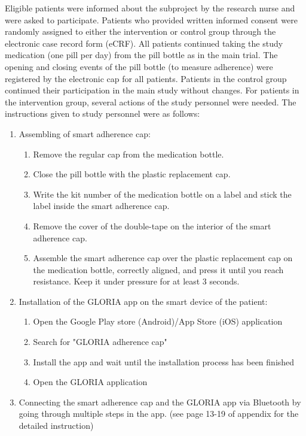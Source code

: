 \documentclass[twocolumn, issue, empirical, authordate]{jote-new-article}
\begin{document}
 Eligible patients were informed about the subproject by the research nurse and were asked to participate. Patients who provided written informed consent were randomly assigned to either the intervention or control group through the electronic case record form (eCRF). All patients continued taking the study medication (one pill per day) from the pill bottle as in the main trial. The opening and closing events of the pill bottle (to measure adherence) were registered by the electronic cap for all patients. Patients in the control group continued their participation in the main study without changes. For patients in the intervention group, several actions of the study personnel were needed.
 The instructions given to study personnel were as follows: 
\begin{enumerate}
\def\labelenumi{\arabic{enumi}.}
\item Assembling of smart adherence cap: \begin{enumerate}
 \def\labelenumii{\alph{enumii}.}
 \item Remove the regular cap from the medication bottle.
 \item Close the pill bottle with the plastic replacement cap.
 \item Write the kit number of the medication bottle on a label and stick the label inside the smart adherence cap.
 \item Remove the cover of the double-tape on the interior of the smart adherence cap.
 \item Assemble the smart adherence cap over the plastic replacement cap on the medication bottle, correctly aligned, and press it until you reach resistance. Keep it under pressure for at least 3 seconds.
 \end{enumerate}
\item Installation of the GLORIA app on the smart device of the patient: \begin{enumerate}
 \def\labelenumii{\alph{enumii}.}
 \item Open the Google Play store (Android)/App Store (iOS) application \item Search for "GLORIA adherence cap"
 \item Install the app and wait until the installation process has been finished \item Open the GLORIA application \end{enumerate}
\item Connecting the smart adherence cap and the GLORIA app via Bluetooth by going through multiple steps in the app. (see page 13-19 of appendix for the detailed instruction)
\end{enumerate}
\end{document}
